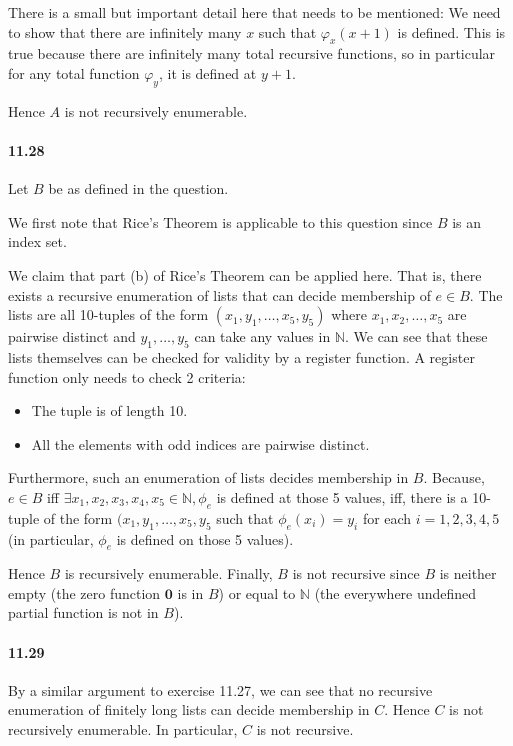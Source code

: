 \documentclass{article}
\begin{document}
There is a small but important detail here that needs to be mentioned: We need to show that there are infinitely many $x$ such that $\varphi_x(x+1)$ is defined. This is true because there are infinitely many total recursive functions, so in particular for any total function $\varphi_y$, it is defined at $y+1$.

Hence $A$ is not recursively enumerable.

\paragraph{11.28} Let $B$ be as defined in the question.

We first note that Rice's Theorem is applicable to this question since $B$ is an index set.

We claim that part (b) of Rice's Theorem can be applied here. That is, there exists a recursive enumeration of lists that can decide membership of $e\in B$. The lists are all 10-tuples of the form $(x_1,y_1,\dots, x_5,y_5)$ where $x_1,x_2,\dots, x_5$ are pairwise distinct and $y_1,\dots,y_5$ can take any values in $\mathbb{N}$. We can see that these lists themselves can be checked for validity by a register function. A register function only needs to check 2 criteria:
\begin{itemize}
	\item The tuple is of length 10.
	\item All the elements with odd indices are pairwise distinct.
\end{itemize}

Furthermore, such an enumeration of lists decides membership in $B$. Because, $e\in B$ iff $\exists x_1,x_2,x_3,x_4,x_5\in \mathbb{N}, \phi_e$ is defined at those 5 values, iff, there is a 10-tuple of the form $(x_1,y_1,\dots,x_5,y_5$ such that $\phi_e(x_i) = y_i$ for each $i=1,2,3,4,5$ (in particular, $\phi_e$ is defined on those 5 values).

Hence $B$ is recursively enumerable. Finally, $B$ is not recursive since $B$ is neither empty (the zero function $\mathbf{0}$ is in $B$) or equal to $\mathbb{N}$ (the everywhere undefined partial function is not in $B$).

\paragraph{11.29} By a similar argument to exercise 11.27, we can see that no recursive enumeration of finitely long lists can decide membership in $C$. Hence $C$ is not recursively enumerable. In particular, $C$ is not recursive.
\end{document}
